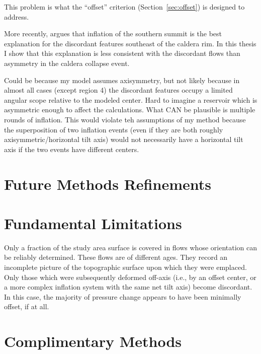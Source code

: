 This problem is what the ``offset'' criterion (Section~\ref{sec:offset}) is designed to address.

More recently, \parencite{mouginis-mark_late-stage_2019} argues that inflation of the southern summit is the best explanation for the discordant features southeast of the caldera rim. In this thesis I show that this explanation is less consistent with the discordant flows than asymmetry in the caldera collapse event. 

Could be because my model assumes axisymmetry, but not likely because in almost all cases (except region 4) the discordant features occupy a limited angular scope relative to the modeled center. Hard to imagine a reservoir which is asymmetric enough to affect the calculations. What CAN be plausible is multiple rounds of inflation. This would violate teh assumptions of my method because the superposition of two inflation events (even if they are both roughly axisymmetric/horizontal tilt axis) would not necessarily have a horizontal tilt axis if the two events have different centers.

\section{Future Methods Refinements}

\section{Fundamental Limitations}

Only a fraction of the study area surface is covered in flows whose orientation can be reliably determined. These flows are of different ages. They record an incomplete picture of the topographic surface upon which they were emplaced. Only those which were subsequently deformed off-axis (i.e., by an offset center, or a more complex inflation system with the same net tilt axis) become discordant. In this case, the majority of pressure change appears to have been minimally offset, if at all.

\section{Complimentary Methods}

